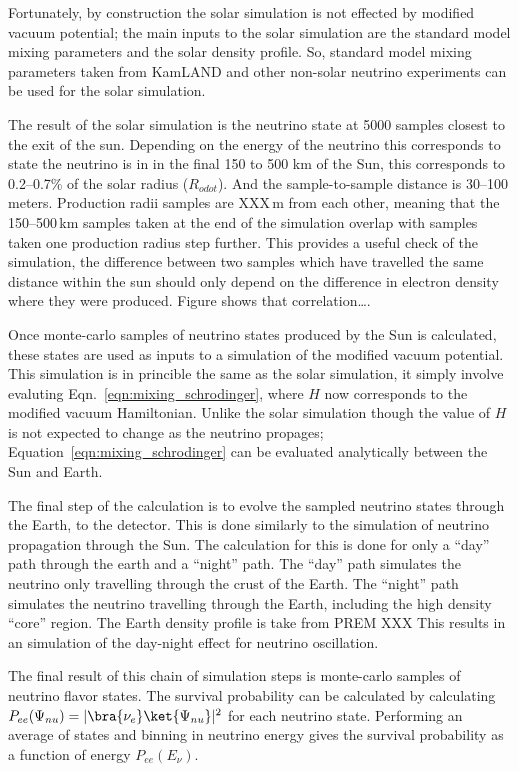 Fortunately, by construction the solar simulation is not effected by modified
vacuum potential; the main inputs to the solar simulation are the standard model
mixing parameters and the solar density profile. So, standard model mixing parameters
taken from KamLAND and other non-solar neutrino experiments can be used for
the solar simulation.

The result of the solar simulation is the neutrino state at 5000 samples
closest to the exit of the sun. Depending on the energy of the neutrino this
corresponds to state the neutrino is in in the final  150 to 500 km of
the Sun, this corresponds to \numrange{0.2}{0.7}\% of the solar radius ($R_{odot}$).
And the sample-to-sample distance is \numrange{30}{100} meters.
Production radii samples are XXX\,m from each other, meaning that
the \numrange{150}{500}\,km samples taken at the end of the simulation
overlap with samples taken one production radius step further.
This provides a useful check of the simulation, the difference between two
samples which have travelled the same distance within the sun should only depend
on the difference in electron density where they were produced.
Figure shows that correlation\ldots.%

Once  monte-carlo samples of neutrino states produced by the Sun is calculated, these
states are used as inputs to a simulation of the modified vacuum potential.
This simulation is in princible the same as the solar simulation,
it simply involve evaluting Eqn.~\ref{eqn:mixing_schrodinger}, where $H$ now
corresponds to the modified vacuum Hamiltonian.
Unlike the solar simulation though the value of $H$ is not expected to change
as the neutrino propages; Equation~\ref{eqn:mixing_schrodinger} can be evaluated analytically
between the Sun and Earth.

The final step of the calculation is to evolve the sampled neutrino states through
the Earth, to the detector.
This is done similarly to the simulation of neutrino propagation through the
Sun.
The calculation for this is done for only a ``day'' path through the earth
and a ``night'' path. The ``day'' path simulates the neutrino only travelling
through the crust of the Earth. The ``night'' path simulates the neutrino
travelling through the Earth, including the high density ``core'' region.
The Earth density profile is take from PREM XXX%
This results in an simulation of the day-night effect for neutrino
oscillation.

The final result of this chain of simulation steps is monte-carlo samples
of neutrino flavor states. The survival probability can be calculated by calculating
$P_{ee}(\Psi_{nu}) = |\bra{\nu_{e}}\ket{\Psi_{nu}}|^2$ for each neutrino state.
Performing an average of states and binning in neutrino energy gives the survival
probability as a function of energy $P_{ee}(E_{\nu})$.

